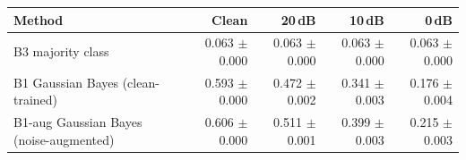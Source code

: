\begin{tabular}{@{}lrrrr@{}}
\toprule
Method & Clean & 20\,dB & 10\,dB & 0\,dB \\
\midrule
B3 majority class & 0.063 $\pm$ 0.000 & 0.063 $\pm$ 0.000 & 0.063 $\pm$ 0.000 & 0.063 $\pm$ 0.000 \\
B1 Gaussian Bayes (clean-trained) & 0.593 $\pm$ 0.000 & 0.472 $\pm$ 0.002 & 0.341 $\pm$ 0.003 & 0.176 $\pm$ 0.004 \\
B1-aug Gaussian Bayes (noise-augmented) & 0.606 $\pm$ 0.000 & 0.511 $\pm$ 0.001 & 0.399 $\pm$ 0.003 & 0.215 $\pm$ 0.003 \\
\bottomrule
\end{tabular}
